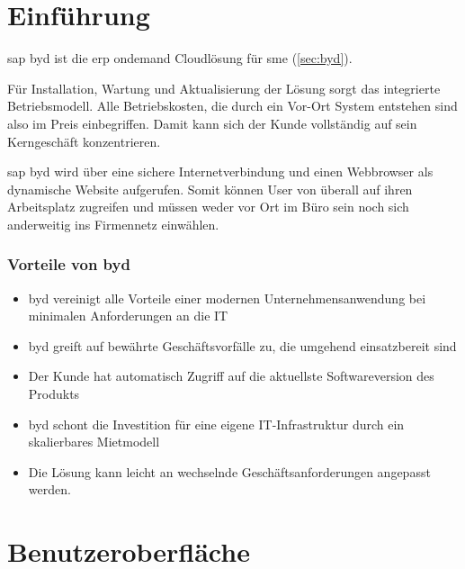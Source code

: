 \section{Einführung}

\gls{sap} \gls{byd} ist die \gls{erp} \gls{ondemand} Cloudlösung für \gls{sme} (\ref{sec:byd}).

Für Installation, Wartung und Aktualisierung der Lösung sorgt das integrierte Betriebsmodell. Alle Betriebskosten, die durch ein Vor-Ort System entstehen sind also im Preis einbegriffen. Damit kann sich der Kunde vollständig auf sein Kerngeschäft konzentrieren.

\gls{sap} \gls{byd} wird über eine sichere Internetverbindung und einen Webbrowser als dynamische Website aufgerufen. Somit können User von überall auf ihren Arbeitsplatz zugreifen und müssen weder vor Ort im Büro sein noch sich anderweitig ins Firmennetz einwählen.

\subsubsection{Vorteile von \gls{byd}}

\begin{itemize}
\item \gls{byd} vereinigt alle Vorteile einer modernen Unternehmensanwendung bei minimalen Anforderungen an die IT
\item \gls{byd} greift auf bewährte Geschäftsvorfälle zu, die umgehend einsatzbereit sind
\item Der Kunde hat automatisch Zugriff auf die aktuellste Softwareversion des Produkts
\item \gls{byd} schont die Investition für eine eigene IT-Infrastruktur durch ein skalierbares Mietmodell
\item Die Lösung kann leicht an wechselnde Geschäftsanforderungen angepasst werden.
\end{itemize}
\cite{itelligence}

\section{Benutzeroberfläche}

